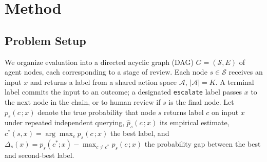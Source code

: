 %
%

\section{Method}
\label{sec:method}

\subsection{Problem Setup}
\label{sec:setup}

We organize evaluation into a directed acyclic graph (DAG) $G = (\mathcal{S}, E)$ of agent nodes, each corresponding to a stage of review. Each node $s \in \mathcal{S}$ receives an input $x$ and returns a label from a shared action space $\mathcal{A}$, $|\mathcal{A}| = K$. A terminal label commits the input to an outcome; a designated \texttt{escalate} label passes $x$ to the next node in the chain, or to human review if $s$ is the final node. Let $p_s(c\,;x)$ denote the true probability that node $s$ returns label $c$ on input $x$ under repeated independent querying, $\hat p_s(c\,;x)$ its empirical estimate, $c^*(s,x) = \arg\max_c p_s(c\,;x)$ the best label, and $\Delta_s(x) = p_s(c^*;x) - \max_{c \neq c^*} p_s(c\,;x)$ the probability gap between the best and second-best label.

